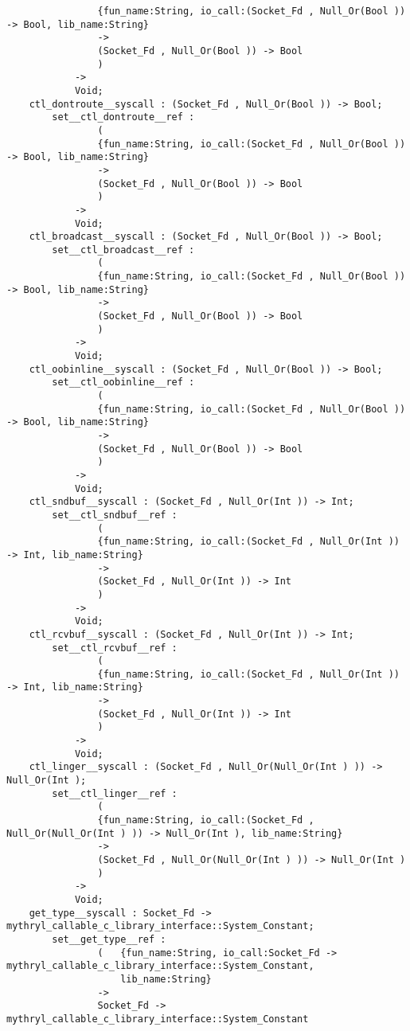 \begin{verbatim}
                {fun_name:String, io_call:(Socket_Fd , Null_Or(Bool )) -> Bool, lib_name:String}
                ->
                (Socket_Fd , Null_Or(Bool )) -> Bool
                )
            ->
            Void;
    ctl_dontroute__syscall : (Socket_Fd , Null_Or(Bool )) -> Bool;
        set__ctl_dontroute__ref :
                (
                {fun_name:String, io_call:(Socket_Fd , Null_Or(Bool )) -> Bool, lib_name:String}
                ->
                (Socket_Fd , Null_Or(Bool )) -> Bool
                )
            ->
            Void;
    ctl_broadcast__syscall : (Socket_Fd , Null_Or(Bool )) -> Bool;
        set__ctl_broadcast__ref :
                (
                {fun_name:String, io_call:(Socket_Fd , Null_Or(Bool )) -> Bool, lib_name:String}
                ->
                (Socket_Fd , Null_Or(Bool )) -> Bool
                )
            ->
            Void;
    ctl_oobinline__syscall : (Socket_Fd , Null_Or(Bool )) -> Bool;
        set__ctl_oobinline__ref :
                (
                {fun_name:String, io_call:(Socket_Fd , Null_Or(Bool )) -> Bool, lib_name:String}
                ->
                (Socket_Fd , Null_Or(Bool )) -> Bool
                )
            ->
            Void;
    ctl_sndbuf__syscall : (Socket_Fd , Null_Or(Int )) -> Int;
        set__ctl_sndbuf__ref :
                (
                {fun_name:String, io_call:(Socket_Fd , Null_Or(Int )) -> Int, lib_name:String}
                ->
                (Socket_Fd , Null_Or(Int )) -> Int
                )
            ->
            Void;
    ctl_rcvbuf__syscall : (Socket_Fd , Null_Or(Int )) -> Int;
        set__ctl_rcvbuf__ref :
                (
                {fun_name:String, io_call:(Socket_Fd , Null_Or(Int )) -> Int, lib_name:String}
                ->
                (Socket_Fd , Null_Or(Int )) -> Int
                )
            ->
            Void;
    ctl_linger__syscall : (Socket_Fd , Null_Or(Null_Or(Int ) )) -> Null_Or(Int );
        set__ctl_linger__ref :
                (
                {fun_name:String, io_call:(Socket_Fd , Null_Or(Null_Or(Int ) )) -> Null_Or(Int ), lib_name:String}
                ->
                (Socket_Fd , Null_Or(Null_Or(Int ) )) -> Null_Or(Int )
                )
            ->
            Void;
    get_type__syscall : Socket_Fd -> mythryl_callable_c_library_interface::System_Constant;
        set__get_type__ref :
                (   {fun_name:String, io_call:Socket_Fd -> mythryl_callable_c_library_interface::System_Constant,
                    lib_name:String}
                ->
                Socket_Fd -> mythryl_callable_c_library_interface::System_Constant

\end{verbatim}
